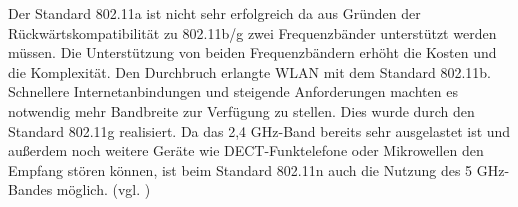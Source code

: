 \begin{table}[htb]
\centering
\caption{Übersicht der WLAN-Standards \cite{SWB-430171331}}
\label{tab:WLAN-Standards}
\end{table} 

Der Standard 802.11a ist nicht sehr erfolgreich da aus Gründen der Rückwärtskompatibilität zu 802.11b/g zwei Frequenzbänder unterstützt werden müssen. Die Unterstützung von beiden Frequenzbändern erhöht die Kosten und die Komplexität. Den Durchbruch erlangte WLAN mit dem Standard 802.11b. Schnellere Internetanbindungen und steigende Anforderungen machten es notwendig mehr Bandbreite zur Verfügung zu stellen. Dies wurde durch den Standard 802.11g realisiert. Da das 2,4 GHz-Band bereits sehr ausgelastet ist und außerdem noch weitere Geräte wie DECT-Funktelefone oder Mikrowellen den Empfang stören können, ist beim Standard 802.11n auch die Nutzung des 5 GHz-Bandes möglich. (vgl. \cite{SWB-430171331})\\

